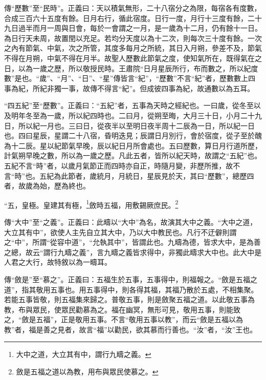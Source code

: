 {\noindent\zhuan{}\fzbyks 傳“歷數”至“民時”。正義曰：天以積氣無形，二十八宿分之為限，每宿各有度數，合成三百六十五度有餘。日月右行，循此宿度。日行一度，月行十三度有餘，二十九日過半而月一周與日會，每於一會謂之一月，是一歲為十二月，仍有餘十一日。為日行天未周，故置閏以充足。若均分天度以為十二次，則每次三十度有餘。一次之內有節氣、中氣，次之所管，其度多每月之所統，其日入月朔，參差不及，節氣不得在月朔，中氣不得在月半。故聖人歷數此節氣之度，使知氣所在，既得氣在之日，以為一歲之歷，所以敬授民時。王肅院“日月星辰所行，布而數之，所以紀度數”是也。“歲”、“月”、“日”、“星”傳皆言“紀”，“歷數”不言“紀”者，歷數數上四事為紀，所紀非獨一事，故傳不得言“紀”。但成彼四事為紀，故通數以為五耳。 \par}

{\noindent\shu{}\fzkt “四五紀”至“歷數”。正義曰：“五紀”者，五事為天時之經紀也。一曰歲，從冬至以及明年冬至為一歲，所以紀四時也。二曰月，從朔至晦，大月三十日，小月二十九日，所以紀一月也。三曰日，從夜半以至明日夜半周十二辰為一日，所以紀一日也。四曰星辰，星謂二十八宿，昏明迭見；辰謂日月別行，會於宿度，從子至於醜為十二辰。星以紀節氣早晚，辰以紀日月所會處也。五曰歷數，算日月行道所歷，計氣朔早晚之數，所以為一歲之歷。凡此五者，皆所以紀天時，故謂之“五紀”也。五紀不言“時”者，以歲月氣節正而四時亦自正，時隨月變，非歷所推，故不言“時”也。五紀為此節者，歲統月，月統日，星辰見於天，其曰“歷數”，總歷四者，故歲為始，歷為終也。 \par}

“五，皇極。皇建其有極，\footnote{大中之道，大立其有中，謂行九疇之義。}斂時五福，用敷錫厥庶民。\footnote{斂是五福之道以為教，用布與眾民使慕之。}


{\noindent\zhuan{}\fzbyks 傳“大中”至“之義”。正義曰：此疇以“大中”為名，故演其大中之義。“大中之道，大立其有中”，欲使人主先自立其大中，乃以大中教民也。凡行不迂僻則謂之“中”，所謂“從容中道”，“允執其中”，皆謂此也。九疇為德，皆求大中，是為善之總，故云“謂行九疇之義”，言九疇之義皆求得中，非獨此疇求大中也。此大中是人君之大行，故特敘以為一疇耳。 \par}

{\noindent\zhuan{}\fzbyks 傳“斂是”至“慕之”。正義曰：五福生於五事，五事得中，則福報之。“斂是五福之道”，指其敬用五事也。用五事得中，則各得其福，其福乃散於五處，不相集聚。若能五事皆敬，則五福集來歸之。普敬五事，則是斂聚五福之道。以此敬五事為教，布與眾民，使眾民勸慕為之。福在幽冥，無形可見，敬用五事，則能致之，“斂是五福”，正是敬用五事。不言“敬用五事以教”，而云“斂是五福以為教”者，福是善之見者，故言“福”以勸民，欲其慕而行善也。“汝”者，“汝”王也。 \par}


